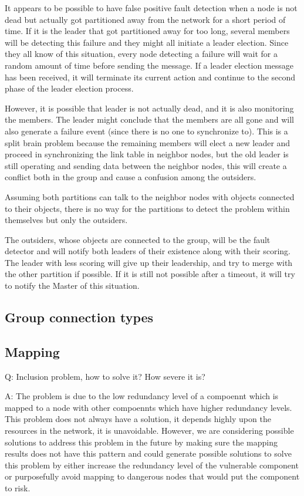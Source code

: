 It appears to be possible to have false positive fault detection when a node is not dead but actually got partitioned away from the network for a short period of time. If it is the leader that got partitioned away for too long, several members will be detecting this failure and they might all initiate a leader election. Since they all know of this situation, every node detecting a failure will wait for a random amount of time before sending the message. If a leader election message has been received, it will terminate its current action and continue to the second phase of the leader election process.

However, it is possible that leader is not actually dead, and it is also monitoring the members. The leader might conclude that the members are all gone and will also generate a failure event (since there is no one to synchronize to). This is a split brain problem because the remaining members will elect a new leader and proceed in synchronizing the link table in neighbor nodes, but the old leader is still operating and sending data between the neighbor nodes, this will create a conflict both in the group and cause a confusion among the outsiders.

Assuming both partitions can talk to the neighbor nodes with objects connected to their objects, there is no way for the partitions to detect the problem within themselves but only the outsiders.

The outsiders, whose objects are connected to the group, will be the fault detector and will notify both leaders of their existence along with their scoring. The leader with less scoring will give up their leadership, and try to merge with the other partition if possible. If it is still not possible after a timeout, it will try to notify the Master of this situation.

\subsection{Group connection types}

\subsection{Mapping}

Q: Inclusion problem, how to solve it? How severe it is?

A: The problem is due to the low redundancy level of a compoennt which is
mapped to a node with other compoennts which have higher redundancy levels.
This problem does not always have a solution, it depends highly upon the
resources in the network, it is unavoidable. However, we are considering
possible solutions to address this problem in the future by making sure the
mapping results does not have this pattern and could generate possible
solutions to solve this problem by either increase the redundancy level of the
vulnerable component or purposefully avoid mapping to dangerous nodes that
would put the component to risk.

